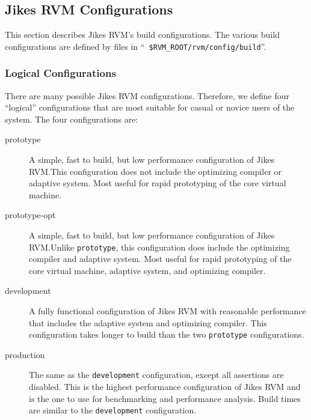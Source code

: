 \subsection{Jikes RVM Configurations}\label{configs}%
%

This section describes Jikes\TMweb{} RVM's build configurations.
The various build configurations are defined by files in ``{\tt
\$RVM\-\_\-ROOT\-/\-rvm\-/\-con\-fig\-/\-build}''.

\subsubsection{Logical Configurations}%
\newcommand{\configName}[1]{\texttt{#1}}%

There are many possible Jikes RVM configurations.
Therefore, we define four ``logical'' configurations that are most
suitable for casual or novice users of the system.  The four
configurations are: 
\begin{description}

\item[prototype] A simple, fast to build, but low performance
configuration of Jikes RVM.\@  This configuration does not include the
optimizing compiler or adaptive system.  Most useful for rapid
prototyping of the core virtual machine.

\item[prototype-opt] A simple, fast to build, but low performance
configuration of Jikes RVM.\@  Unlike \configName{prototype}, this
configuration does include the optimizing compiler and adaptive system. Most useful for
rapid prototyping of the core virtual machine, adaptive system, and
optimizing compiler. 

\item[development] A fully functional configuration of
Jikes RVM with reasonable performance that includes the adaptive
system and optimizing compiler.  This configuration takes longer to
build than the two \configName{prototype} configurations.

\item[production] The same as the \configName{development} configuration,
except all assertions are disabled.  This is the highest performance
configuration of Jikes RVM and is the one to use for benchmarking and
performance analysis. Build times are similar to the \configName{development} 
configuration. 

\end{description}

